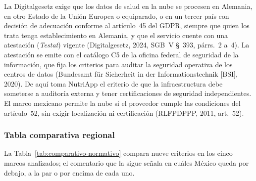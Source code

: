 \documentclass[12pt, a4paper]{article}
\begin{document}
La Digitalgesetz
exige que los datos de salud en la nube se procesen en Alemania, en otro Estado de la Unión Europea o equiparado, o en un tercer país con decisión de adecuación conforme al artículo~45 del GDPR, siempre que quien los trata tenga establecimiento en Alemania, y que el servicio cuente con una atestación (\textit{Testat}) vigente (Digitalgesetz, 2024, SGB~V \S~393, párrs.~2 a~4). La atestación se emite con el
catálogo C5 de la oficina federal de seguridad de la
información, que fija los criterios para auditar la seguridad
operativa de los centros de datos (Bundesamt für Sicherheit in der
Informationstechnik [BSI], 2020). De aquí toma NutriApp el criterio
de que la infraestructura debe someterse a auditoría externa y tener
certificaciones de seguridad independientes. El marco mexicano
permite la nube si el proveedor cumple las condiciones del
artículo~52, sin exigir localización ni certificación (RLFPDPPP,
2011, art.~52).

\subsubsection{Tabla comparativa regional}
La Tabla~\ref{tab:comparativo-normativo} compara nueve criterios en los cinco marcos
analizados; el comentario que la sigue señala en cuáles México queda por debajo, a la par o
por encima de cada uno.
\end{document}

